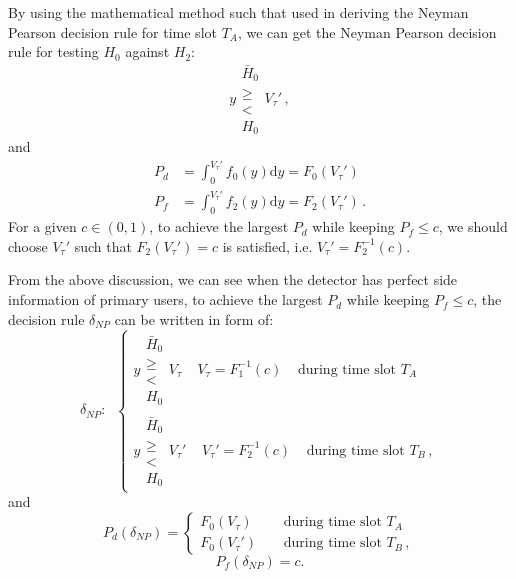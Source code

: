 By using the mathematical method such that used in deriving the Neyman Pearson decision rule for time slot $T_A$, we can get the Neyman Pearson decision rule for testing $H_0$ against $H_2$:
\begin{equation}
  y  \substack{\bar{H}_0 \\ \geq \\ < \\ H_0} V_\tau'\,,
  \label{20150628a0}
\end{equation}
and  
\begin{equation}
  \begin{split}
  P_d &= \int_{0}^{V_\tau'} f_0(y) \mathrm{d}y = F_0(V_\tau')\\
  P_f &= \int_{0}^{V_\tau'} f_2(y) \mathrm{d}y= F_2(V_\tau')\,.
    \end{split}
    \label{20150628a1}
  \end{equation}
For a given $c \in (0, 1)$, to achieve the largest  $P_d$ while keeping $P_f \leq c$, we should choose $V_\tau'$ such that $F_2(V_\tau') = c$ is satisfied, i.e. $V_\tau' = F^{-1}_2(c)$. 

From the above discussion, we can see when the detector has perfect side information of primary users, to achieve the largest $P_d$ while keeping $P_f \leq c$, the decision rule $\delta_{NP}$ can be written in form of:
\begin{equation}
  \delta_{NP}:\;\;
\begin{cases}
 y  \substack{\bar{H}_0 \\ \geq \\ < \\ H_0} V_\tau\;\;\;\;V_\tau = F_1^{-1}(c)\;\;\;\;\text{during time slot $T_A$}\\
y  \substack{\bar{H}_0 \\ \geq \\ < \\ H_0} V_\tau'\;\;\;\;V_\tau' = F_2^{-1}(c)\;\;\;\;\text{during time slot $T_B$}\,,
\end{cases}
\label{20150702b1}
\end{equation}
and 
\begin{equation}
  P_d(\delta_{NP}) = \begin{cases}
    F_0(V_\tau)\;\;\;\;&\text{during time slot $T_A$}\\
    F_0(V_\tau')\;\;\;\;&\text{during time slot $T_B$}\,,
  \end{cases}
  \label{20150702b2}
\end{equation}
\begin{equation}
  P_f(\delta_{NP}) = c.
\end{equation}

